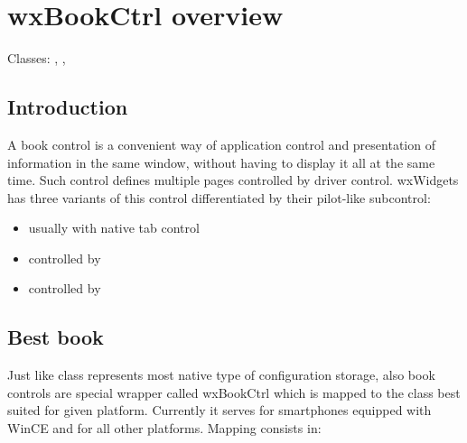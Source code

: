 
\section{wxBookCtrl overview}\label{wxbookctrloverview}

Classes: , , 

\subsection{Introduction}\label{wxbookctrlintro}

A book control is a convenient way of application control and presentation of information
in the same window, without having to display it all at the same time. Such control defines
multiple pages controlled by driver control. wxWidgets has three variants of this control
differentiated by their pilot-like subcontrol:

\begin{itemize}\itemsep=0pt
\item {} usually with native tab control
\item {} controlled by 
\item {} controlled by 
\end{itemize}

\subsection{Best book}\label{wxbestbookctrl}

Just like  class represents most native type of configuration
storage, also book controls are special wrapper called wxBookCtrl which is mapped to the
class best suited for given platform. Currently it serves 
for smartphones equipped with WinCE and  for all other platforms.
Mapping consists in:

